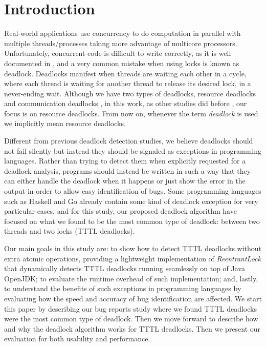 \section{Introduction}

Real-world applications use concurrency to do computation in parallel with multiple threads/processes taking more advantage of multicore processors. Unfortunately, concurrent code is difficult to write correctly, as it is well documented in \cite{lu}, and a very common mistake when using locks is known as deadlock.
Deadlocks manifest when threads are waiting each other in a cycle, where each thread is waiting for another thread to release its desired lock, in a never-ending wait.
Although we have two types of deadlocks, resource deadlocks and communication deadlocks \cite{singhal} \cite{knapp}, in this work, as other studies did before \cite{mcsdk} \cite{magicfuzzer}, our focus is on resource deadlocks. From now on, whenever the term \emph{deadlock} is used we implicitly mean resource deadlocks.

Different from previous deadlock detection studies, we believe deadlocks should not fail silently but instead they should be signaled as exceptions in programming languages. Rather than trying to detect them when explicitly requested for a deadlock analysis, programs should instead be written in such a way that they can either handle the deadlock when it happens or just show the error in the output in order to allow easy identification of bugs. Some programming languages such as Haskell and Go already contain some kind of deadlock exception for very particular cases, and for this study, our proposed deadlock algorithm have focused on what we found to be the most common type of deadlock: between two threads and two locks (TTTL deadlocks).

Our main goals in this study are: to show how to detect TTTL deadlocks without extra atomic operations, providing a lightweight implementation of \emph{ReentrantLock} that dynamically detects TTTL deadlocks running seamlessly on top of Java OpenJDK; to evaluate the runtime overhead of such implementation; and, lastly, to understand the benefits of such exceptions in programming languages by evaluating how the speed and accuracy of bug identification are affected. We start this paper by describing our bug reports study where we found TTTL deadlocks were the most common type of deadlock. Then we move forward to describe how and why the deadlock algorithm works for TTTL deadlocks. Then we present our evaluation for both usability and performance.





